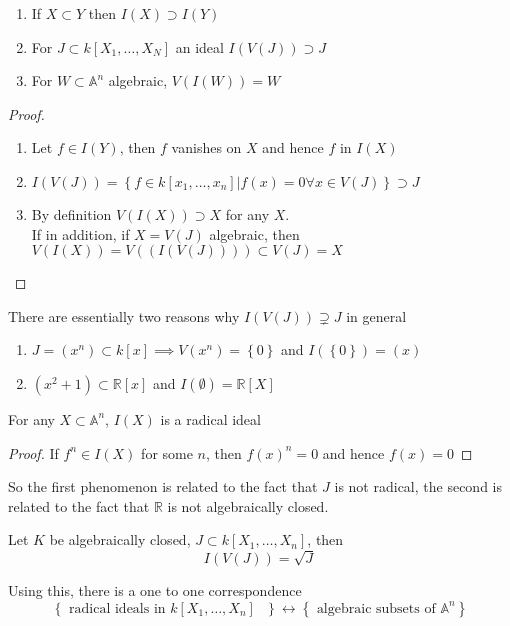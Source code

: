 \documentclass[../main.tex]{subfiles}
\begin{document}
\begin{lemma}
\begin{enumerate}
\item If $X \subset Y$ then $I( X) \supset I( Y) $ 
\item For $J \subset k[X_1,\ldots, X_N]$ an ideal $I( V( J) ) \supset J$ 
\item For $W \subset \mathbb{A}^{n}$ algebraic, $V( I( W) ) =W$ 
\end{enumerate}

\end{lemma}
\begin{proof}
\begin{enumerate}
\item Let $f\in I( Y) $, then $f$ vanishes on $X$ and hence $f$ in $I(X) $ 
\item $ I( V( J) ) = \left\{ f\in k[x_1,\ldots, x_n]| f( x) =0 \forall x \in V( J)  \right\} \supset J$ 
\item By definition $V( I( X) ) \supset X$ for any $X$.\\
	If in addition, if $X= V( J) $ algebraic, then $V( I( X) ) = V( ( I( V( J) ) ) ) \subset V( J)= X $ 
\end{enumerate}
\end{proof}
There are essentially two reasons why $ I( V( J) ) \supsetneq J$ in general
\begin{enumerate}
	\item $J= ( x^{n}) \subset k[x]\implies V( x^{n}) = \left\{ 0 \right\} $ and $I( \left\{ 0 \right\} ) = ( x) $ 
	\item $ ( x^{2}+1) \subset \mathbb{R}[x]$ and $I( \emptyset) = \mathbb{R}[X]$ 
\end{enumerate}
\begin{lemma}
For any $X \subset \mathbb{A}^{n}$, $I( X) $ is a radical ideal
\end{lemma}
\begin{proof}
If $f^{n}\in I( X) $ for some $n$, then $f( x) ^{n}= 0$ and hence $f( x) =0$ 
\end{proof}
So the first phenomenon is related to the fact that $J$ is not radical, the second is related to the fact that $\mathbb{R}$ is not algebraically closed.
\begin{thm}
	Let $K$ be algebraically closed, $J \subset k[X_1,\ldots, X_n]$, then 
	\[ 
	I( V( J) ) = \sqrt{J} 
	\]
	
\end{thm}
Using this, there is a one to one correspondence
\[ 
	\left\{ \text{ radical ideals in $k[X_1,\ldots, X_n]$  }  \right\} \leftrightarrow \left\{ \text{ algebraic subsets of }  \mathbb{A}^{n} \right\} 
\]
\end{document}
